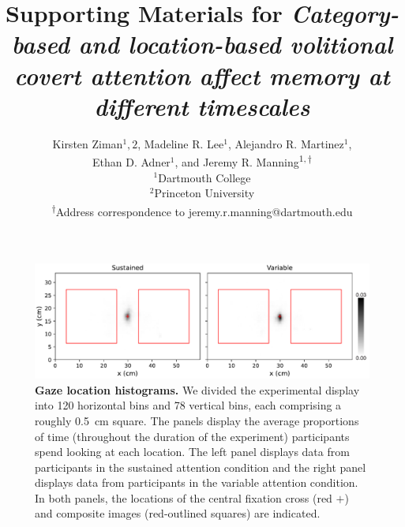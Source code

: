 \documentclass{article}
\begin{document}
\title{Supporting Materials for \textit{Category-based and location-based volitional covert attention affect
memory at different timescales}}

\author{Kirsten Ziman$^1, 2$,
Madeline R. Lee$^1$,
Alejandro R. Martinez$^1$,\\
Ethan D. Adner$^1$,
and
Jeremy R. Manning\textsuperscript{$1, \dagger$}\\[0.1in]$^1$Dartmouth College\\
$^2$Princeton University\\
\textsuperscript{$\dagger$}Address correspondence to jeremy.r.manning@dartmouth.edu}


  \maketitle

  \renewcommand{\thefigure}{S\arabic{figure}}


  \begin{figure}[tp]
	\centering
	\includegraphics[width=1\textwidth]{figs/gaze_locations}
  
 \caption{\textbf{Gaze location histograms.} We divided the experimental
 display into 120 horizontal bins and 78 vertical bins, each comprising a
 roughly 0.5~cm square. The panels display the average proportions of time
 (throughout the duration of the experiment) participants spend looking at each
 location. The left panel displays data from participants in the sustained
 attention condition and the right panel displays data from participants in the
 variable attention condition. In both panels, the locations of the central
 fixation cross (red $+$) and composite images (red-outlined squares) are
 indicated.}
  
  \label{fig:gaze-histograms}
  \end{figure}
\end{document}
